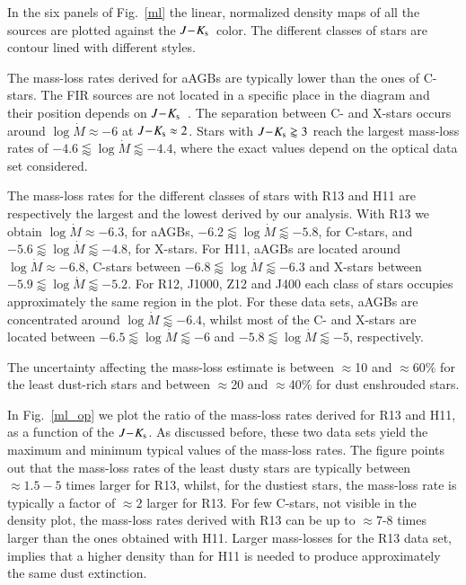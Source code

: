 \documentclass[useAMS,usenatbib]{mn2e/mn2e}
\newcommand{\jks}{\mbox{$J\!-\!K_{\rm s}$}}
\begin{document}
In the six panels of Fig.~\ref{ml} the linear, normalized density maps of all the sources are plotted against the \jks\ color. The different classes of stars are contour lined with different styles.

The mass-loss rates derived for aAGBs are typically lower than the ones of C-stars. 
The FIR sources are not located in a specific place in the diagram and their position depends on \jks\ .
The separation between C- and X-stars occurs around $\log\dot{M}\approx-6$ at $\jks\approx 2$. Stars with $\jks\gtrapprox3$ reach the largest mass-loss rates of $-4.6\lessapprox\log\dot{M}\lessapprox-4.4$, where the exact values depend on the optical data set considered. 

The mass-loss rates for the different classes of stars with R13 and H11 are respectively the largest and the lowest derived by our analysis.
With R13 we obtain $\log\dot{M}\approx-6.3$, for aAGBs, $-6.2\lessapprox\log\dot{M}\lessapprox-5.8$, for C-stars, and $-5.6\lessapprox\log\dot{M}\lessapprox-4.8$, for X-stars.
For H11, aAGBs are located around $\log\dot{M}\approx-6.8$, C-stars between $-6.8\lessapprox\log\dot{M}\lessapprox-6.3$ and X-stars between $-5.9\lessapprox\log\dot{M}\lessapprox-5.2$.
For R12, J1000, Z12 and J400 each class of stars occupies approximately the same region in the plot. For these data sets, aAGBs are concentrated around $\log\dot{M}\lessapprox-6.4$, whilst most of the C- and X-stars are located between $-6.5\lessapprox\log\dot{M}\lessapprox-6$ and $-5.8\lessapprox\log\dot{M}\lessapprox-5$, respectively.

The uncertainty affecting the mass-loss estimate is between $\approx$10 and $\approx$60$\%$ for the least dust-rich stars and between $\approx$20 and $\approx$40$\%$ for dust enshrouded stars.

In Fig.~\ref{ml_op} we plot the ratio of the mass-loss rates derived for R13 and H11, as a function of the \jks. As discussed before, these two data sets yield the maximum and minimum typical values of the mass-loss rates.
The figure points out that the mass-loss rates of the least dusty stars are typically between $\approx1.5-5$ times larger for R13, whilst, for the dustiest stars, the mass-loss rate is typically a factor of $\approx2$ larger for R13. 
For few C-stars, not visible in the density plot, the mass-loss rates derived with R13 can be up to $\approx$7-8 times larger than the ones obtained with H11.
Larger mass-losses for the R13 data set, implies that a higher density than for H11 is needed to produce approximately the same dust extinction.
\end{document}
